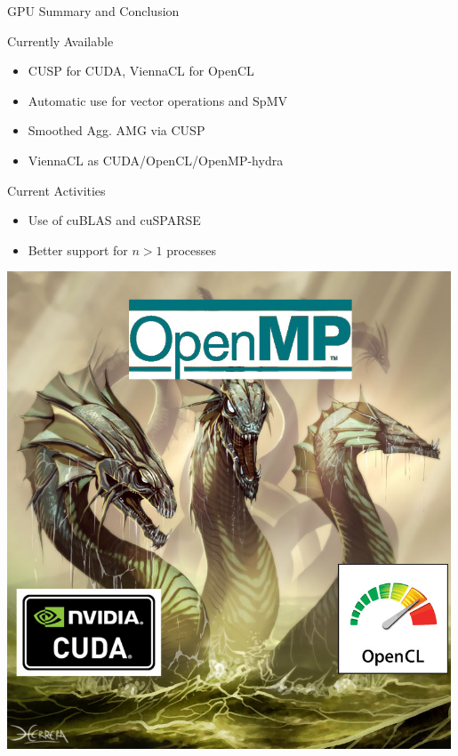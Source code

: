 \begin{frame}{GPU Summary and Conclusion}

  \begin{block}{Currently Available}
    \begin{itemize}
     \item CUSP for CUDA, ViennaCL for OpenCL
     \item Automatic use for vector operations and SpMV
     \item Smoothed Agg. AMG via CUSP
      \item ViennaCL as CUDA/OpenCL/OpenMP-hydra
    \end{itemize}
  \end{block}

  \begin{minipage}{0.7\textwidth}
    \begin{block}{Current Activities}
      \begin{itemize}
      \item Use of cuBLAS and cuSPARSE
      \item Better support for $n>1$ processes
      \end{itemize}
    \end{block}
  \end{minipage}
  \begin{minipage}{0.29\textwidth}
    \includegraphics[width=0.99\textwidth]{figures/hydra}
  \end{minipage}

\end{frame}



